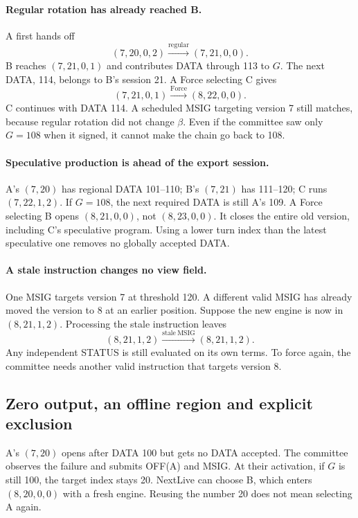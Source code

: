 \documentclass[11pt,a4paper]{article}
\begin{document}
\paragraph{Regular rotation has already reached B.}
A first hands off
\[
 (7,20,0,2)\xrightarrow{\mathrm{regular}}(7,21,0,0).
\]
B reaches $(7,21,0,1)$ and contributes DATA through 113 to $G$. The next
DATA, 114, belongs to B's session 21. A Force selecting C gives
\[
 (7,21,0,1)\xrightarrow{\mathrm{Force}}(8,22,0,0).
\]
C continues with DATA 114. A scheduled MSIG targeting version 7 still
matches, because regular rotation did not change $\beta$. Even if the
committee saw only $G=108$ when it signed, it cannot make the chain go
back to 108.

\paragraph{Speculative production is ahead of the export session.}
A's $(7,20)$ has regional DATA 101--110; B's $(7,21)$ has 111--120; C runs
$(7,22,1,2)$. If $G=108$, the next required DATA is still A's 109. A Force
selecting B opens $(8,21,0,0)$, not $(8,23,0,0)$. It closes the entire old
version, including C's speculative program. Using a lower turn index than
the latest speculative one removes no globally accepted DATA.

\paragraph{A stale instruction changes no view field.}
One MSIG targets version 7 at threshold 120. A different valid MSIG has
already moved the version to 8 at an earlier position. Suppose the new
engine is now in $(8,21,1,2)$. Processing the stale instruction leaves
\[
 (8,21,1,2)\xrightarrow{\mathrm{stale\ MSIG}}(8,21,1,2).
\]
Any independent STATUS is still evaluated on its own terms. To force
again, the committee needs another valid instruction that targets
version 8.

\subsection{Zero output, an offline region and explicit exclusion}
\label{sec:retry-example}
A's $(7,20)$ opens after DATA 100 but gets no DATA accepted. The committee
observes the failure and submits OFF(A) and MSIG. At their activation, if
$G$ is still 100, the target index stays 20. NextLive can choose B, which
enters $(8,20,0,0)$ with a fresh engine. Reusing the number 20 does not
mean selecting A again.
\end{document}
